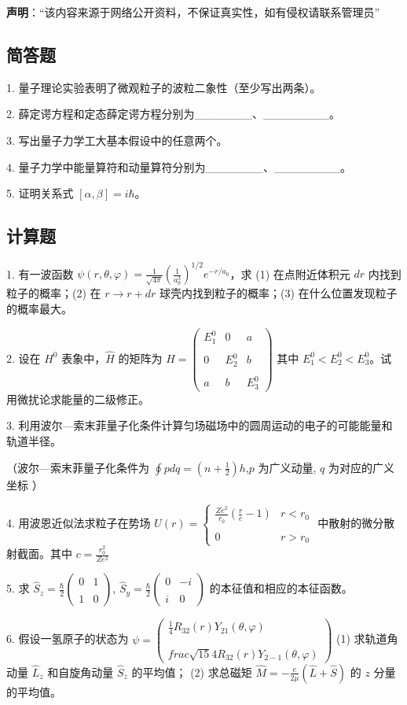
\textbf{声明}：“该内容来源于网络公开资料，不保证真实性，如有侵权请联系管理员”

\subsection{简答题}

1. 量子理论实验表明了微观粒子的波粒二象性（至少写出两条）。

2. 薛定谔方程和定态薛定谔方程分别为_______、________。

3. 写出量子力学工大基本假设中的任意两个。

4. 量子力学中能量算符和动量算符分别为_______、________。

5. 证明关系式 $[\alpha, \beta] = i \hbar$。

\subsection{计算题}

1. 有一波函数 $\psi(r, \theta, \varphi) = \frac{1}{\sqrt{4 \pi}} \left( \frac{1}{a_0^3} \right)^{1/2} e^{-r/a_0}$，求 (1) 在点附近体积元 $dr$ 内找到粒子的概率；(2) 在 $r \to r + dr$ 球壳内找到粒子的概率；(3) 在什么位置发现粒子的概率最大。

2. 设在 $H^0$ 表象中，$\hat{H}$ 的矩阵为
$\hat{H} = \begin{pmatrix}E_1^0 & 0 & a \\\\0 & E_2^0 & b \\\\a & b & E_3^0\end{pmatrix}$
其中 $E_1^0 < E_2^0 < E_3^0$。试用微扰论求能量的二级修正。

3. 利用波尔—索末菲量子化条件计算匀场磁场中的圆周运动的电子的可能能量和轨道半径。

（波尔—索末菲量子化条件为 $\oint p dq = (n + \frac{1}{2}) h$,$p$ 为广义动量, $q$ 为对应的广义坐标 ）

4. 用波恩近似法求粒子在势场 $U(r) = \begin{cases} 
\frac{Z e^2}{r_0} \left( \frac{r}{c} - 1 \right) & r < r_0 \\\\
0 & r > r_0
\end{cases}$ 中散射的微分散射截面。其中
$c = \frac{r_0^2}{Z e^2}$

5. 求 $\hat{S}_z = \frac{\hbar}{2} \begin{pmatrix}
0 & 1 \\\\
1 & 0
\end{pmatrix}$, $\hat{S}_y = \frac{\hbar}{2} \begin{pmatrix}
0 & -i \\\\
i & 0
\end{pmatrix}$ 的本征值和相应的本征函数。

6. 假设一氢原子的状态为
$\psi = \begin{pmatrix}\frac{1}{4} R_{32}(r) Y_{21}(\theta, \varphi) \\\\\\frac{\sqrt{15}}{4} R_{32}(r) Y_{2-1}(\theta, \varphi)\end{pmatrix}$
(1) 求轨道角动量 $\hat{L}_z$ 和自旋角动量 $\hat{S}_z$ 的平均值；
(2) 求总磁矩 $\hat{M} = -\frac{e}{2\mu} (\hat{L} + \hat{S})$ 的 $z$ 分量的平均值。
